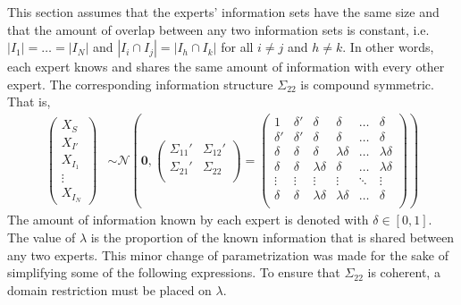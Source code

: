 \documentclass[11pt]{article}
\theoremstyle{definition}
\theoremstyle{definition}
\begin{document}
This section assumes that the experts' information sets have the same size and that the amount of overlap between any two information sets is constant, i.e.  $|I_{1}| =  \dots = |I_{N}|$ and $|I_{i} \cap I_{j}| = |I_{h} \cap I_{k}|$ for all $i \neq j$ and $h \neq k$. In other words, each expert knows and shares the same amount of information with every other expert. The corresponding information structure $\Sigma_{22}$ is compound symmetric. That is,
\begin{align*}
\left(\begin{matrix} X_{S} \\ X_{I'}\\ X_{I_1}\\ \vdots \\ X_{I_N} \end{matrix}\right) &\sim \mathcal{N}\left( 
 \boldsymbol{0}, \left(\begin{matrix} 
\Sigma_{11}' & \Sigma_{12}'\\
\Sigma_{21}' & \Sigma_{22}\\
 \end{matrix}\right) 
 =
 \left(\begin{array}{cc|cccc}
1 & \delta'& \delta & \delta & \dots & \delta  \\ 
\delta' & \delta' & \delta & \delta & \dots & \delta  \\ \hline
\delta & \delta &\delta & \lambda\delta & \dots & \lambda\delta   \\ 
\delta& \delta & \lambda\delta & \delta & \dots & \lambda\delta  \\ 
\vdots &\vdots & \vdots & \vdots & \ddots & \vdots  \\ 
\delta &\delta & \lambda\delta & \lambda\delta & \dots & \delta\\ 
 \end{array}\right)\right)
\end{align*}
The amount of information known by each expert is denoted with $\delta \in [0,1]$. The value of $\lambda$ is the proportion of the known information that is shared between any two experts.  This minor change of parametrization was made for the sake of simplifying some of the following expressions. To ensure that $\Sigma_{22}$ is coherent, a domain restriction must be placed on $\lambda$. 
\end{document}
